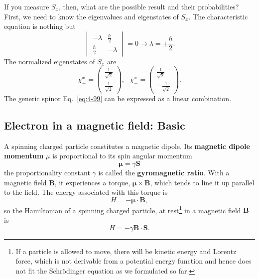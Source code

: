 If you measure $S_x$, then, what are the possible result and their probabilities?
First, we need to know the eigenvalues and eigenstates of $S_x$.
The characteristic equation is nothing but
\begin{equation*}
  \begin{vmatrix}
    -\lambda & \frac{\hbar}{2} \\
    \frac{\hbar}{2} & -\lambda
  \end{vmatrix}
  = 0  \to \lambda = \pm \frac{\hbar}{2}.
\end{equation*}
The normalized eigenstates of $S_x$ are
\begin{equation}
  \label{eq:4-107}
  \chi_+^x =
  \begin{pmatrix}
    \frac{1}{\sqrt{2}}\\
    \frac{1}{\sqrt{2}}
  \end{pmatrix}, ~ ~ ~
  \chi_-^x =
  \begin{pmatrix}
    \frac{1}{\sqrt{2}}\\
    - \frac{1}{\sqrt{2}}
  \end{pmatrix}.
\end{equation}
The generic spinor Eq.~\eqref{eq:4-99} can be expressed as a linear combination.

\subsection{Electron in a magnetic field: Basic}
A spinning charged particle constitutes a magnetic dipole.
Its \textbf{magnetic dipole momentum} $\mu$ is proportional to its spin angular momentum
\begin{equation}
  \label{eq:4-108}
 \boldsymbol{\mu} = \gamma \mathbf{S}
\end{equation}
the proportionality constant $\gamma$ is called the \textbf{gyromagnetic ratio}.
With a magnetic field $\mathbf{B}$, it experiences a torque, $\boldsymbol{\mu} \times \mathbf{B}$, which tends to line it up parallel to the field.
The energy associated with this torque is
\begin{equation}
  \label{eq:4-109}
 H = - \boldsymbol{\mu} \cdot \mathbf{B},
\end{equation}
so the Hamiltonian of a spinning charged particle, at rest\footnote{If a particle is allowed to move, there will be kinetic energy and Lorentz force, which is not derivable from a potential energy function and hence does not fit the Schr\"odinger equation as we formulated so far.} in a magnetic field $\mathbf{B}$ is
\begin{equation}
  \label{eq:4-110}
  H = - \gamma \mathbf{B} \cdot \mathbf{S}.
\end{equation}

